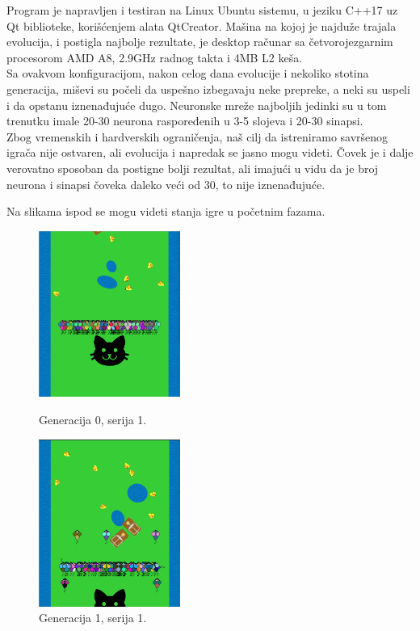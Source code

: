 \documentclass[a4paper]{article}
\begin{document}
Program je napravljen i testiran na Linux Ubuntu sistemu, u jeziku C++17 uz Qt biblioteke, korišćenjem alata QtCreator. Mašina na kojoj je najduže trajala evolucija, i postigla najbolje rezultate, je desktop računar sa četvorojezgarnim procesorom AMD A8, 2.9GHz radnog takta i 4MB L2 keša. \\

Sa ovakvom konfiguracijom, nakon celog dana evolucije i nekoliko stotina generacija, miševi su počeli da uspešno izbegavaju neke prepreke, a neki su uspeli i da opstanu iznenađujuće dugo. Neuronske mreže najboljih jedinki su u tom trenutku imale 20-30 neurona raspoređenih u 3-5 slojeva i 20-30 sinapsi. \\

Zbog vremenskih i hardverskih ograničenja, naš cilj da istreniramo savršenog igrača nije ostvaren, ali evolucija i napredak se jasno mogu videti. Čovek je i dalje verovatno sposoban da postigne bolji rezultat, ali imajući u vidu da je broj neurona i sinapsi čoveka daleko veći od 30, to nije iznenađujuće.

Na slikama ispod se mogu videti stanja igre u početnim fazama.

\begin{figure}[!h]
  \centering
  \begin{minipage}[b]{0.4\textwidth}
    \includegraphics[width=175px]{gen0_batch1.png}
    \caption{Generacija 0, serija 1.}
    \label{fig:gen0batch1}
  \end{minipage}
  \hfill
  \begin{minipage}[b]{0.4\textwidth}
    \includegraphics[width=175px]{gen1_batch1.png}
    \caption{Generacija 1, serija 1.}
    \label{fig:gen1batch1}
  \end{minipage}
\end{figure}
\end{document}
